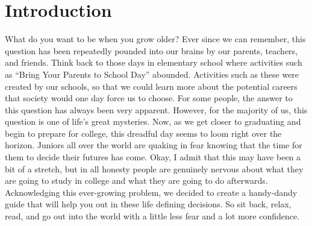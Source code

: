\chapter{Introduction}

What do you want to be when you grow older? Ever since we can remember, this question has been repeatedly pounded into our brains by our parents, teachers, and friends. Think back to those days in elementary school where activities such as “Bring Your Parents to School Day” abounded. Activities such as these were created by our schools, so that we could learn more about the potential careers that society would one day force us to choose. For some people, the answer to this question has always been very apparent. However, for the majority of us, this question is one of life’s great mysteries. Now, as we get closer to graduating and begin to prepare for college, this dreadful day seems to loom right over the horizon. Juniors all over the world are quaking in fear knowing that the time for them to decide their futures has come. Okay, I admit that this may have been a bit of a stretch, but in all honesty people are genuinely nervous about what they are going to study in college and what they are going to do afterwards. Acknowledging this ever-growing problem, we decided to create a handy-dandy guide that will help you out in these life defining decisions. So sit back, relax, read, and go out into the world with a little less fear and a lot more confidence. 
